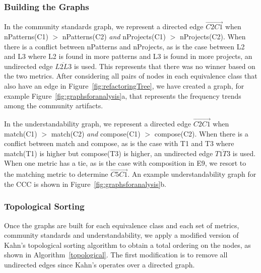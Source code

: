 \subsubsection{Building the Graphs}
In the community standards graph, we represent a directed edge  $\overrightarrow{C2  C1}$ when  nPatterns(C1) $>$ nPatterns(C2) \emph{and}  nProjects(C1) $>$ nProjects(C2).
When there is a conflict between nPatterns and nProjects, as is the case between L2 and L3 where L2 is found in more patterns and L3 is found in more projects, an undirected edge $\overline{L2L3}$ is used.
This represents that there was no winner based on the two metrics.
After considering all pairs of nodes in each equivalence class that also have an edge in Figure~\ref{fig:refactoringTree}, we have created a graph, for example Figure~\ref{fig:graphsforanalysis}a, that represents the frequency trends among the community artifacts.

In the understandability graph, we represent a directed edge  $\overrightarrow{C2C1}$ when match(C1) $>$ match(C2) \emph{and} compose(C1) $>$ compose(C2). When there is a conflict between match and compose, as is the case with T1 and T3 where match(T1) is higher but compose(T3) is higher, an undirected edge $\overline{T1T3}$ is used. When one metric has a tie, as is the case with composition in E9, we resort to the matching metric to determine  $\overrightarrow{C5C1}$. An example understandability graph for the CCC is shown in Figure~\ref{fig:graphsforanalysis}b.

\subsubsection{Topological Sorting}
Once the graphs are built for each equivalence class and each set of metrics, community standards and understandability, we apply a modified version of Kahn's topological sorting algorithm to obtain a total ordering on the nodes, as shown in Algorithm~\ref{topological}. The first modification is to remove all undirected edges since Kahn's operates over a directed graph.


